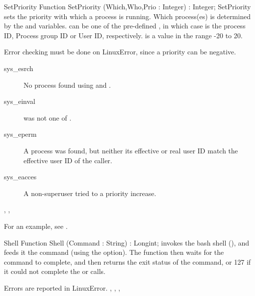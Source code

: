\begin{function}{SetPriority}
\Declaration
Function SetPriority (Which,Who,Prio : Integer) : Integer;
\Description
SetPriority sets the priority with which a process is running.
Which process(es) is determined by the  and  variables.
 can be one of the pre-defined , in which case  is the process ID, Process group ID or
User ID, respectively.
 is a value in the range -20 to 20.

\Errors

 Error checking must be done on LinuxError, since a priority can be negative.
 \begin{description}
 \item[sys\_esrch] No process found using  and .
 \item[sys\_einval]  was not one of .
 \item[sys\_eperm] A process was found, but neither its effective or real
 user ID match the effective user ID of the caller.
 \item [sys\_eacces] A non-superuser tried to a priority increase.
 \end{description}
 
\SeeAlso
{}, , 
\end{function}
For an example, see .

\begin{function}{Shell}
\Declaration
Function Shell (Command : String) : Longint;
\Description
{} invokes the bash shell (), and feeds it the
command  (using the  option). The function then waits
for the command to complete, and then returns the exit
status of the command, or 127 if it could not complete the  
or  calls.

\Errors
Errors are reported in LinuxError.
\SeeAlso
{}, , , 
\end{function}


